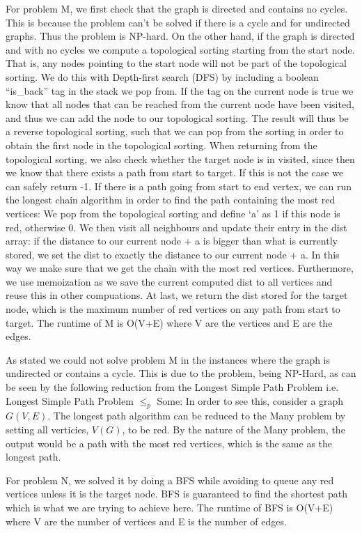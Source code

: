 \documentclass[a4paper]{article}
\begin{document}
For problem M, we first check that the graph is directed and contains no cycles. This is because the problem can’t be solved if there is a cycle and for undirected graphs. Thus the problem is NP-hard. On the other hand, if the graph is directed and with no cycles we compute a topological sorting starting from the start node. That is, any nodes pointing to the start node will not
 be part of the topological sorting. We do this with Depth-first search (DFS) by including a boolean “is\_back” tag in the stack we pop from. If the tag on the current node is true we know that all nodes that can be reached from the current node have been visited, and thus we can add the node to our topological sorting. The result will thus be a reverse topological sorting, 
such that we can pop from the sorting in order to obtain the first node in the topological sorting. When returning from the topological sorting, we also check whether the target node is in visited, since then we know that there exists a path from start to target. If this is not the case we can safely return
 -1. If there is a path going from start to end vertex, we can run the longest chain algorithm in order to find the path containing the most red vertices: We pop from the topological sorting and define ‘a’ as 1 if this node is red, otherwise 0. We then visit all neighbours and update their entry in the dist array: if the distance to our current node + a is bigger
 than what is currently stored, we set the dist to exactly the distance to our current node + a. In this way we make sure that we get the chain with the most red vertices. Furthermore, we use memoization as we save the current computed dist to all vertices and reuse this in other compuations. At last, we return the dist stored for the target node, which is the maximum number of red vertices on any path from start to target. The runtime of M is O(V+E) where V are the vertices and E are the edges.
 
As stated we could not solve problem M in the instances where the graph is undirected or contains a cycle. This is due to the problem, being NP-Hard, as can be seen by the following reduction from the Longest Simple Path Problem i.e. Longest Simple Path Problem $\leq_p$ Some: In order to see this, consider a graph $G(V,E)$. The longest path algorithm can be reduced to the Many problem by setting all verticies, $V(G)$, to be red. By the nature of the Many problem, the output would be a path with the most red vertices, which is the same as the longest path. 

For problem N, we solved it by doing a BFS while avoiding to queue any red vertices unless it is the target node. BFS is guaranteed
to find the shortest path which is what we are trying to achieve here.
The runtime of BFS is O(V+E) where V are the number of vertices and E is the number of edges.
\end{document}
